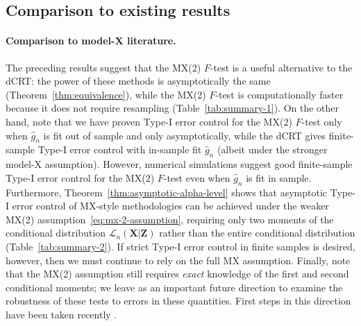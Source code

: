 \documentclass[12pt]{article}
\theoremstyle{definition}
\theoremstyle{remark}
\newcommand{\prx}{\bm X}
\newcommand{\prz}{\bm Z}
\newcommand{\pry}{{\bm Y}}
\begin{document}
\clearpage


\subsection{Comparison to existing results} \label{sec:comparison-to-existing-results-3}

\paragraph{Comparison to model-X literature.}

The preceding results suggest that the MX(2) $F$-test is a useful alternative to the dCRT: the power of these methods is asymptotically the same (Theorem~\ref{thm:equivalence}), while the MX(2) $F$-test is computationally faster because it does not require resampling (Table~\ref{tab:summary-1}). On the other hand, note that we have proven Type-I error control for the MX(2) $F$-test only when $\widehat g_n$ is fit out of sample and only asymptotically, while the dCRT gives finite-sample Type-I error control with in-sample fit $\widehat g_n$ (albeit under the stronger model-X assumption). However, numerical simulations suggest good finite-sample Type-I error control for the MX(2) $F$-test even when $\widehat g_n$ is fit in sample. Furthermore, Theorem~\ref{thm:asymptotic-alpha-level} shows that asymptotic Type-I error control of MX-style methodologies can be achieved under the weaker MX(2) assumption~\eqref{eq:mx-2-assumption}, requiring only two moments of the conditional distribution $\mathcal L_n(\prx|\prz)$ rather than the entire conditional distribution (Table~\ref{tab:summary-2}). If strict Type-I error control in finite samples is desired, however, then we must continue to rely on the full MX assumption. %
Finally, note that the MX(2) assumption still requires \textit{exact} knowledge of the first and second conditional moments; we leave as an important future direction to examine the robustness of these tests to errors in these quantities. First steps in this direction have been taken recently \cite{Berrett2019, Li2022a}.


\end{document}
